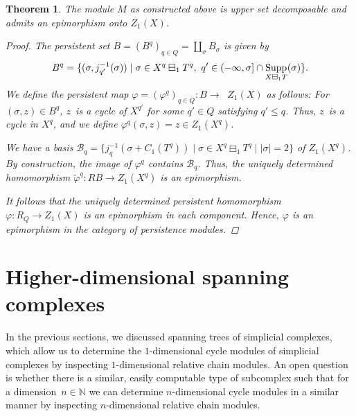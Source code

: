 \documentclass[oneside]{amsart}
\newtheorem{theorem}{Theorem}
\theoremstyle{definition}
\DeclareMathOperator\Supp{Supp}
\begin{document}
\begin{theorem}%
    \label{theorem:GenH1}
    The module $M$ as constructed above is upper set decomposable and admits an epimorphism onto $Z_1(X)$.

    \begin{proof}
        The persistent set $B = (B^q)_{q \in Q} =  \coprod_{\sigma} B_\sigma$ is given by
        \[ B^q = \{ (\sigma, j^{-1}_{q'}(\sigma)) \mid \sigma \in X^q \boxminus_1 T^q,\ q' \in (-\infty, \sigma] \cap \Supp_{X \boxminus_1 T}(\sigma) \} \text. \]
        We define the persistent map $\varphi = (\varphi^q)_{q \in Q} \colon B \to \mathop{U_Q} Z_1(X)$ as follows:
        For $(\sigma, z) \in B^q$, $z$~is a cycle of $X^{q'}$ for some $q' \in Q$ satisfying $q' \leq q$.
        Thus, $z$~is a cycle in $X^q$, and we define $\varphi^q(\sigma, z) = z \in Z_1(X^q)$.
    
        We have a basis $\mathcal B_q = \{ j_q^{-1}(\sigma + C_1(T^q)) \mid \sigma \in X^q \boxminus_1 T^q \mid |\sigma| = 2 \}$ of $Z_1(X^q)$.
        By construction, the image of $\varphi^q$ contains $\mathcal B_q$.
        Thus, the uniquely determined homomorphism $\tilde \varphi^q\colon R B \to Z_1(X^q)$ is an epimorphism.
    
        It follows that the uniquely determined persistent homomorphism $\varphi\colon R_Q \to Z_1(X)$ is an epimorphism in each component.
        Hence, $\varphi$ is an epimorphism in the category of persistence modules.
    \end{proof}    
\end{theorem}

\section{Higher-dimensional spanning complexes}%
\label{section:HigherDimensionalSpanningSubcomplexes}

In the previous sections, we discussed spanning trees of simplicial complexes, which allow us to determine the $1$-dimensional cycle modules of simplicial complexes by inspecting $1$-dimensional relative chain modules.
An open question is whether there is a similar, easily computable type of subcomplex such that for a dimension~$n \in \mathbb N$ we can determine $n$-dimensional cycle modules in a similar manner by inspecting $n$-dimensional relative chain modules.
\end{document}
